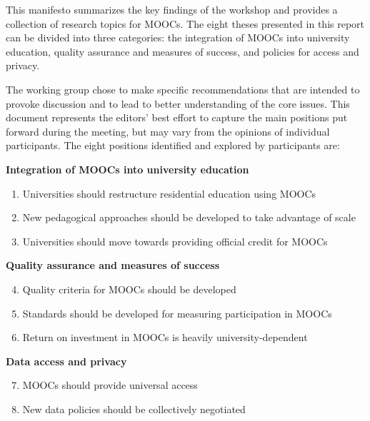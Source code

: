 
This manifesto summarizes the key findings of the workshop and provides
a collection of research topics for MOOCs. The eight theses presented in
this report can be divided into three categories: the integration of
MOOCs into university education, quality assurance and measures of
success, and policies for access and privacy.


The working group chose to make specific recommendations that are intended to provoke discussion 
and to lead to better understanding of the core issues. This document represents the
editors' best effort to capture the main positions put forward during the meeting,
but may vary from the opinions of individual participants.
The eight positions identified and explored by participants are:

\vspace{1ex}
\textbf{Integration of MOOCs into university education}

\begin{enumerate}

\item Universities should restructure residential education using
MOOCs

\item New pedagogical approaches should be developed to take
advantage of scale

\item Universities should move towards providing official
credit for MOOCs

\end{enumerate}

\textbf{Quality assurance and measures of success}

\begin{enumerate}
\setcounter{enumi}{3}

\item Quality criteria for MOOCs should be developed

\item Standards should be developed for measuring
  participation in MOOCs

\item Return on investment in MOOCs is heavily university-dependent

\end{enumerate}

\textbf{Data access and privacy}

\begin{enumerate}
\setcounter{enumi}{6}

\item MOOCs should provide universal access

\item New data policies should be collectively negotiated

\end{enumerate}



